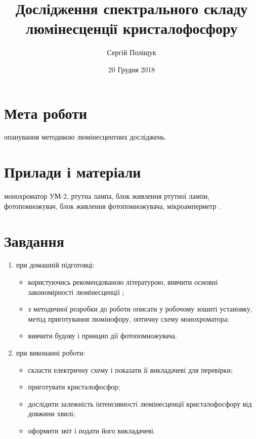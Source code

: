 \documentclass[twocolumn]{el-author}
\date{20 Грудня 2018}
\begin{document}
\title{Дослідження спектрального складу люмінесценції кристалофосфору}

\author{Сергій Поліщук}

\maketitle

\section{Мета роботи}

 опанування методикою люмінесцентних досліджень.

\section{Прилади і матеріали}

монохроматор УМ-2, ртутна лампа, блок живлення
ртутної лампи, фотопомножувач, блок живлення
фотопомножувача, мікроамперметр .

\section{Завдання}

\begin{enumerate}
	\item при домашній підготовці:
	\begin{itemize}
		\item  користуючись рекомендованою літературою, вивчити
основні закономірності люмінесценції ;
		\item  з методичної розробки до роботи описати у робочому зошиті
установку, метод приготування люмінофору, оптичну схему
монохроматора;
		\item  вивчити будову і принцип дії фотопомножувача.
	\end{itemize}
	\item при виконанні роботи:
	\begin{itemize}
		\item  скласти електричну схему і показати її викладачеві для
перевірки;
		\item  приготувати кристалофосфор;
		\item  дослідити залежність інтенсивності люмінесценції
кристалофосфору від довжини хвилі;
		\item  оформити звіт і подати його викладачеві.
	\end{itemize}
	
\end{enumerate}
\end{document}
